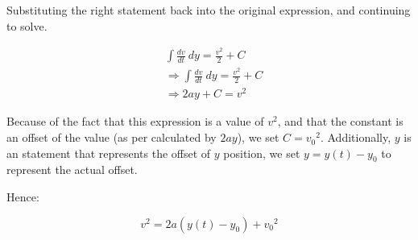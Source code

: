 \documentclass[letterpaper]{article}
\begin{document}
Substituting the right statement back into the original expression, and continuing to solve.

\begin{align}
    & \int \frac{dv}{dt}\ dy = \frac{v^2}{2} + C \\
    & \Rightarrow \int \frac{dv}{dt}\ dy = \frac{v^2}{2} + C\\
    & \Rightarrow 2ay + C = v^2 
\end{align}

Because of the fact that this expression is a value of \(v^2\), and that the constant is an offset of the value (as per calculated by \(2ay\)), we set \(C = {v_0}^2\). Additionally, \(y\) is an statement that represents the offset of \(y\) position, we set \(y = y(t)-y_0\) to represent the actual offset.

Hence:

\begin{equation}
    v^2 = 2a(y(t)-y_0) + {v_0}^2
\end{equation}
\end{document}
